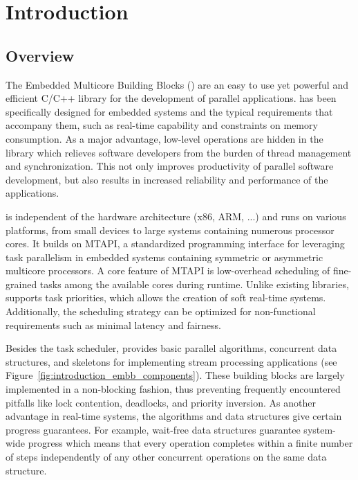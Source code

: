 \chapter{Introduction}

\section{Overview}

The Embedded Multicore Building Blocks (\embb) are an easy to use yet powerful and efficient C/C++ library for the development of parallel applications. \embb has been specifically designed for embedded systems and the typical requirements that accompany them, such as real-time capability and constraints on memory consumption. As a major advantage, low-level operations are hidden in the library which relieves software developers from the burden of thread management and synchronization. This not only improves productivity of parallel software development, but also results in increased reliability and performance of the applications.

\embb is independent of the hardware architecture (x86, ARM, ...) and runs on various platforms, from small devices to large systems containing numerous processor cores. It builds on MTAPI, a standardized programming interface for leveraging task parallelism in embedded systems containing symmetric or asymmetric multicore processors. A core feature of MTAPI is low-overhead scheduling of fine-grained tasks among the available cores during runtime. Unlike existing libraries, \embb supports task priorities, which allows the creation of soft real-time systems. Additionally, the scheduling strategy can be optimized for non-functional requirements such as minimal latency and fairness.

Besides the task scheduler, \embb provides basic parallel algorithms, concurrent data structures, and skeletons for implementing stream processing applications (see Figure~\ref{fig:introduction_embb_components}). These building blocks are largely implemented in a non-blocking fashion, thus preventing frequently encountered pitfalls like lock contention, deadlocks, and priority inversion. As another advantage in real-time systems, the algorithms and data structures give certain progress guarantees. For example, wait-free data structures guarantee system-wide progress which means that every operation completes within a finite number of steps independently of any other concurrent operations on the same data structure.

